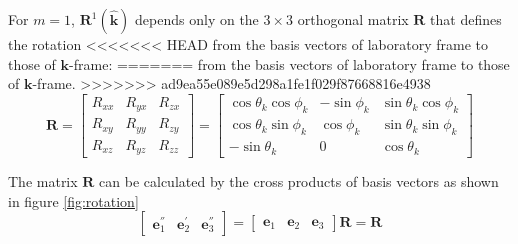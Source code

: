 For $m=1$, $\mathbf{R}^{1}(\hat{\mathbf{k}})$ depends only on the
$3\times3$ orthogonal matrix $\mathbf{R}$ that defines the rotation
<<<<<<< HEAD
from the basis vectors of laboratory frame to those of $\mathbf{k}$-frame:
=======
from the basis vectors of laboratory frame to those of $\mathbf{k}$-frame.
>>>>>>> ad9ea55e089e5d298a1fe1f029f87668816e4938
\begin{equation}
\mathbf{R}=\left[\begin{array}{ccc}
R_{xx} & R_{yx} & R_{zx}\\
R_{xy} & R_{yy} & R_{zy}\\
R_{xz} & R_{yz} & R_{zz}
\end{array}\right]=\left[\begin{array}{ccc}
\cos\theta_{k}\cos\phi_{k} & -\sin\phi_{k} & \sin\theta_{k}\cos\phi_{k}\\
\cos\theta_{k}\sin\phi_{k} & \cos\phi_{k} & \sin\theta_{k}\sin\phi_{k}\\
-\sin\theta_{k} & 0 & \cos\theta_{k}
\end{array}\right]
\end{equation}


The matrix $\mathbf{R}$ can be calculated by the cross products of
basis vectors as shown in figure \ref{fig:rotation}
\begin{equation}
\left[\begin{array}{ccc}
\mathbf{e}_{1}^{''} & \mathbf{e}_{2}^{'} & \mathbf{e}_{3}^{''}\end{array}\right]=\left[\begin{array}{ccc}
\mathbf{e}_{1} & \mathbf{e}_{2} & \mathbf{e}_{3}\end{array}\right]\mathbf{R}=\mathbf{R}
\end{equation}


